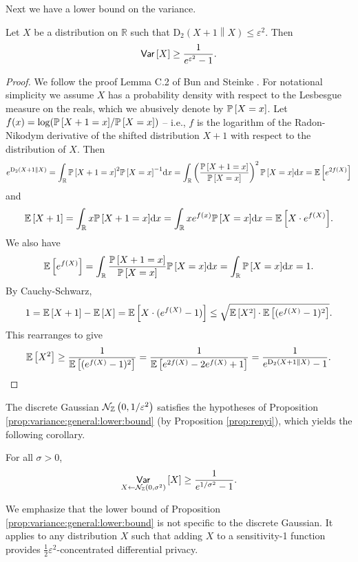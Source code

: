 \documentclass{jpc}
\newcommand{\dgausss}[2]{{\discN\left(#1,#2\right)}}
\newcommand{\dgauss}[1]{\dgausss{0}{#1}}
\newcommand{\ex}[2]{{\ifx&#1& \mathbb{E} \else
\underset{#1}{\mathbb{E}} \fi \left[#2\right]}}
\newcommand{\pr}[2]{{\ifx&#1& \mathbb{P} \else
\underset{#1}{\mathbb{P}} \fi \left[#2\right]}}
\newcommand{\var}[2]{{\ifx&#1& \mathsf{Var} \else
\underset{#1}{\mathsf{Var}} \fi \left[#2\right]}}
\newcommand{\dr}[3]{\mathrm{D}_{#1}\left(#2\middle\|#3\right)}
\newcommand{\R}{\mathbb{R}}
\begin{document}
Next we have a lower bound on the variance. 

\begin{prop}\label{prop:variance:general:lower:bound}
Let $X$ be a distribution on $\R$ such that $\dr{2}{X+1}{X} \le \varepsilon^2$. Then
\begin{equation}
    \var{}{X} \geq \frac{1}{e^{\varepsilon^2}-1}.
\end{equation}
\end{prop}
\begin{proof}
We follow the proof Lemma C.2 of Bun and Steinke \cite{BunS16}. For notational simplicity we assume $X$ has a probability density with respect to the Lesbesgue measure on the reals, which we abusively denote by $\pr{}{X=x}$. Let $f(x)=\log(\pr{}{X+1=x}/\pr{}{X=x})$ -- i.e., $f$ is the logarithm of the Radon-Nikodym derivative of the shifted distribution $X+1$ with respect to the distribution of $X$. Then $$e^{\dr{2}{X+1}{X}} = \int_\R \pr{}{X+1=x}^2 \pr{}{X=x}^{-1} \mathrm{d}x = \int_\R \left(\frac{\pr{}{X+1=x}}{\pr{}{X=x}}\right)^2 \pr{}{X=x} \mathrm{d}x = \ex{}{e^{2f(X)}}$$
and $$\ex{}{X+1} = \int_\R x \pr{}{X+1=x} \mathrm{d}x = \int_\R x e^{f(x)} \pr{}{X=x} \mathrm{d}x = \ex{}{X \cdot e^{f(X)}}.$$
We also have $$\ex{}{e^{f(X)}} = \int_\R \frac{\pr{}{X+1=x}}{\pr{}{X=x}} \pr{}{X=x} \mathrm{d}x = \int_\R \pr{}{X=x} \mathrm{d}x = 1.$$
By Cauchy-Schwarz, $$1=\ex{}{X+1}-\ex{}{X} = \ex{}{X \cdot (e^{f(X)}-1)} \le \sqrt{\ex{}{X^2} \cdot \ex{}{(e^{f(X)}-1)^2}}.$$
This rearranges to give
$$\ex{}{X^2} \ge \frac{1}{\ex{}{(e^{f(X)}-1)^2}} = \frac{1}{\ex{}{e^{2f(X)}-2e^{f(X)}+1}}=\frac{1}{e^{\dr{2}{X+1}{X}}-1}.$$
\end{proof}

The discrete Gaussian $\dgauss{1/\varepsilon^2}$ satisfies the hypotheses of Proposition \ref{prop:variance:general:lower:bound} (by Proposition \ref{prop:renyi}), which yields the following corollary.
\begin{cor}\label{cor:dgauss_var}
For all $\sigma>0$, 
\begin{equation}
    \var{X \gets \dgauss{\sigma^2}}{X} \ge \frac{1}{e^{1/\sigma^2}-1}.
\end{equation}
\end{cor}
We emphasize that the lower bound of Proposition \ref{prop:variance:general:lower:bound} is not specific to the discrete Gaussian. It applies to any distribution $X$ such that adding $X$ to a sensitivity-1 function provides $\frac12\varepsilon^2$-concentrated differential privacy.
\end{document}
